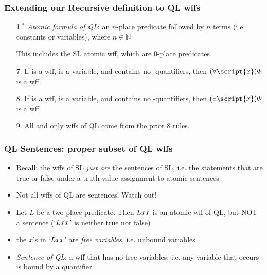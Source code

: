 \begin{frame}
\frametitle{Extending our Recursive definition to QL wffs}

\begin{enumerate}[<+->]

\item[1.$^{\ast}$] \emph{Atomic formula of QL}: an $n$-place predicate followed by $n$ terms (i.e. constants or variables), where $n \in \mathbb{N}$

\item[] This includes the SL atomic wff, which are 0-place predicates

\item[7.] If \metaA{} is a wff,  is a variable, and \alert{\metaA{} contains no -quantifiers}, then \emph{$\qt{\forall}{\script{x}}\metaA{}$} is a wff.

\item[8.] If \metaA{} is a wff,  is a variable, and \alert{\metaA{} contains no -quantifiers}, then \emph{$\qt{\exists}{\script{x}}\metaA{}$} is a wff.

\item[9.] All and only wffs of QL come from the prior 8 rules.

\end{enumerate}



\end{frame}

\begin{frame}
\frametitle{QL Sentences: proper subset of QL wffs}

\begin{itemize}[<+->]

\item Recall: the wffs of SL \textit{just are} the sentences of SL, i.e. the statements that are true or false under a truth-value assignment to atomic sentences 

\item Not all wffs of QL are sentences! Watch out! 

\item Let $L$ be a two-place predicate. Then $Lxx$ is an atomic wff of QL, but NOT a sentence (`$Lxx$' is neither true nor false)

\item the $x$'s in `$Lxx$' are \emph{free variables}, i.e. unbound variables 

\item \emph{Sentence of QL}: a wff that has no free variables: i.e. any variable that occurs is bound by a quantifier 


\end{itemize}
\end{frame}





